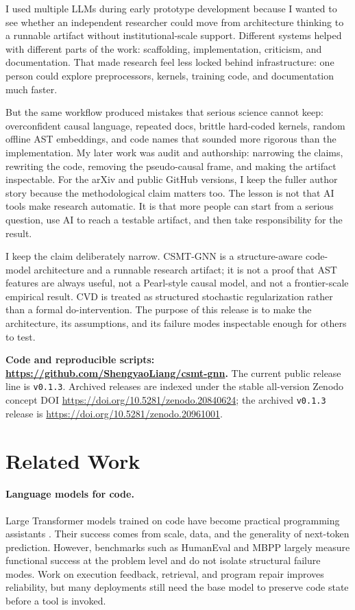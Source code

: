 \documentclass[10pt]{article}
\begin{document}
I used multiple LLMs during early prototype development because I wanted to see
whether an independent researcher could move from architecture thinking to a
runnable artifact without institutional-scale support.  Different systems helped
with different parts of the work: scaffolding, implementation, criticism, and
documentation.  That made research feel less locked behind infrastructure: one
person could explore preprocessors, kernels, training code, and documentation
much faster.

But the same workflow produced mistakes that serious science cannot keep:
overconfident causal language, repeated docs, brittle hard-coded kernels, random
offline AST embeddings, and code names that sounded more rigorous than the
implementation.  My later work was audit and authorship: narrowing the claims,
rewriting the code, removing the pseudo-causal frame, and making the artifact
inspectable.  For the arXiv and public GitHub versions, I keep the fuller author
story because the methodological claim matters too.  The lesson is not that AI
tools make research automatic.  It is that more people can start from a serious
question, use AI to reach a testable artifact, and then take responsibility for
the result.

I keep the claim deliberately narrow.  CSMT-GNN is a structure-aware code-model
architecture and a runnable research artifact; it is not a proof that AST
features are always useful, not a Pearl-style causal model, and not a
frontier-scale empirical result.  CVD is treated as structured stochastic
regularization rather than a formal do-intervention.  The purpose of this
release is to make the architecture, its assumptions, and its failure modes
inspectable enough for others to test.

\noindent\textbf{Code and reproducible scripts:
\href{https://github.com/ShengyaoLiang/csmt-gnn}{https://github.com/ShengyaoLiang/csmt-gnn}.}
The current public release line is \texttt{v0.1.3}.  Archived releases are
indexed under the stable all-version Zenodo concept DOI
\href{https://doi.org/10.5281/zenodo.20840624}{https://doi.org/10.5281/zenodo.20840624};
the archived \texttt{v0.1.3} release is
\href{https://doi.org/10.5281/zenodo.20961001}{https://doi.org/10.5281/zenodo.20961001}.

\section{Related Work}

\paragraph{Language models for code.}
Large Transformer models trained on code have become practical programming
assistants \citep{chen2021evaluating,nijkamp2023codegen,roziere2023code}.  Their
success comes from scale, data, and the generality of next-token prediction.
However, benchmarks such as HumanEval and MBPP largely measure functional
success at the problem level and do not isolate structural failure modes.  Work
on execution feedback, retrieval, and program repair improves reliability, but
many deployments still need the base model to preserve code state before a tool
is invoked.
\end{document}
